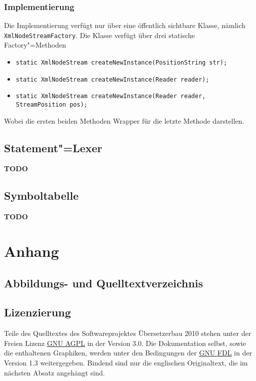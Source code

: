\documentclass[10pt,a4paper,ngerman,titlepage,tocindentauto]{scrartcl}
\newcommand{\TODO}{ {\LARGE\bf\color{crimson} TODO} }
\begin{document}
			\subsubsection*{Implementierung}
				Die Implementierung verfügt nur über eine öffentlich sichtbare Klasse, nämlich \texttt{XmlNodeStreamFactory}.
				Die Klasse verfügt über drei statische Factory"=Methoden
				\begin{itemize}
					\item \texttt{static XmlNodeStream createNewInstance(PositionString str);}
					\item \texttt{static XmlNodeStream createNewInstance(Reader reader);}
					\item \texttt{static XmlNodeStream createNewInstance(Reader reader, StreamPosition pos);}
				\end{itemize}
				Wobei die ersten beiden Methoden Wrapper für die letzte Methode darstellen.
	
		\subsection{Statement"=Lexer}
			\TODO
	
		\subsection{Symboltabelle}
			\TODO
	
	\section{Anhang}
		\subsection{Abbildungs- und Quelltextverzeichnis}
			\listoffigures
			\lstlistoflistings
		
		\subsection{Lizenzierung}
			Teile des Quelltextes des Softwareprojektes Übersetzerbau 2010 stehen unter der Freien
			Lizenz \href{http://www.gnu.org/licenses/agpl-3.0.html}{GNU AGPL} in der Version 3.0.
			Die Dokumentation selbst, sowie die enthaltenen Graphiken, werden unter den Bedingungen
			der \href{http://www.gnu.org/licenses/fdl-1.3.html}{GNU FDL} in der Version 1.3 weitergegeben.
			Bindend sind nur die englischen Originaltext, die im nächsten Absatz angehängt sind.
			
\end{document}
